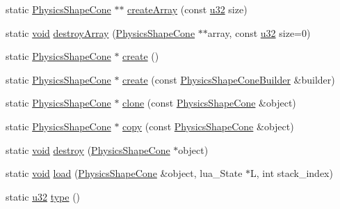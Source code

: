 \begin{DoxyCompactItemize}
\item 
static \mbox{\hyperlink{classnjli_1_1_physics_shape_cone}{Physics\+Shape\+Cone}} $\ast$$\ast$ \mbox{\hyperlink{classnjli_1_1_physics_shape_cone_a53bbad7291cfc99b45a4b755eb853dc3}{create\+Array}} (const \mbox{\hyperlink{_util_8h_a10e94b422ef0c20dcdec20d31a1f5049}{u32}} size)
\item 
static \mbox{\hyperlink{_thread_8h_af1e856da2e658414cb2456cb6f7ebc66}{void}} \mbox{\hyperlink{classnjli_1_1_physics_shape_cone_ab9714f1b9af213f9bab289ac60a6c57a}{destroy\+Array}} (\mbox{\hyperlink{classnjli_1_1_physics_shape_cone}{Physics\+Shape\+Cone}} $\ast$$\ast$array, const \mbox{\hyperlink{_util_8h_a10e94b422ef0c20dcdec20d31a1f5049}{u32}} size=0)
\item 
static \mbox{\hyperlink{classnjli_1_1_physics_shape_cone}{Physics\+Shape\+Cone}} $\ast$ \mbox{\hyperlink{classnjli_1_1_physics_shape_cone_af0f9059a4769091de3f7191544323904}{create}} ()
\item 
static \mbox{\hyperlink{classnjli_1_1_physics_shape_cone}{Physics\+Shape\+Cone}} $\ast$ \mbox{\hyperlink{classnjli_1_1_physics_shape_cone_a01d3c914e19d5d4e539f1f5440f94d78}{create}} (const \mbox{\hyperlink{classnjli_1_1_physics_shape_cone_builder}{Physics\+Shape\+Cone\+Builder}} \&builder)
\item 
static \mbox{\hyperlink{classnjli_1_1_physics_shape_cone}{Physics\+Shape\+Cone}} $\ast$ \mbox{\hyperlink{classnjli_1_1_physics_shape_cone_aa62661a9209d65ef178185bf87aa1285}{clone}} (const \mbox{\hyperlink{classnjli_1_1_physics_shape_cone}{Physics\+Shape\+Cone}} \&object)
\item 
static \mbox{\hyperlink{classnjli_1_1_physics_shape_cone}{Physics\+Shape\+Cone}} $\ast$ \mbox{\hyperlink{classnjli_1_1_physics_shape_cone_aa32dff9bc067849302595ced93cadf39}{copy}} (const \mbox{\hyperlink{classnjli_1_1_physics_shape_cone}{Physics\+Shape\+Cone}} \&object)
\item 
static \mbox{\hyperlink{_thread_8h_af1e856da2e658414cb2456cb6f7ebc66}{void}} \mbox{\hyperlink{classnjli_1_1_physics_shape_cone_a91510476813e2e6d113cf4955035741a}{destroy}} (\mbox{\hyperlink{classnjli_1_1_physics_shape_cone}{Physics\+Shape\+Cone}} $\ast$object)
\item 
static \mbox{\hyperlink{_thread_8h_af1e856da2e658414cb2456cb6f7ebc66}{void}} \mbox{\hyperlink{classnjli_1_1_physics_shape_cone_ac5bd2ec8c47b39939ae5324f36af0e92}{load}} (\mbox{\hyperlink{classnjli_1_1_physics_shape_cone}{Physics\+Shape\+Cone}} \&object, lua\+\_\+\+State $\ast$L, int stack\+\_\+index)
\item 
static \mbox{\hyperlink{_util_8h_a10e94b422ef0c20dcdec20d31a1f5049}{u32}} \mbox{\hyperlink{classnjli_1_1_physics_shape_cone_a8d8bb8d53ec48270be2bf51806ff912f}{type}} ()
\end{DoxyCompactItemize}

